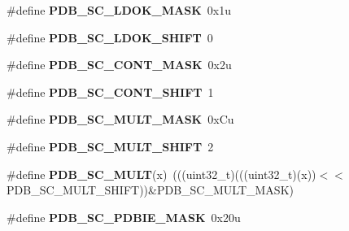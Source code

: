 \begin{DoxyCompactItemize}
\item 
\#define {\bfseries P\+D\+B\+\_\+\+S\+C\+\_\+\+L\+D\+O\+K\+\_\+\+M\+A\+SK}~0x1u\hypertarget{group__PDB__Register__Masks_gabe6a0c2a0e00e0d01b3b94ca8cd90728}{}\label{group__PDB__Register__Masks_gabe6a0c2a0e00e0d01b3b94ca8cd90728}

\item 
\#define {\bfseries P\+D\+B\+\_\+\+S\+C\+\_\+\+L\+D\+O\+K\+\_\+\+S\+H\+I\+FT}~0\hypertarget{group__PDB__Register__Masks_ga8766bd357685d2ec463f51e0b08c6080}{}\label{group__PDB__Register__Masks_ga8766bd357685d2ec463f51e0b08c6080}

\item 
\#define {\bfseries P\+D\+B\+\_\+\+S\+C\+\_\+\+C\+O\+N\+T\+\_\+\+M\+A\+SK}~0x2u\hypertarget{group__PDB__Register__Masks_gaa723ee73c65ba7680ef3c9de87b8a635}{}\label{group__PDB__Register__Masks_gaa723ee73c65ba7680ef3c9de87b8a635}

\item 
\#define {\bfseries P\+D\+B\+\_\+\+S\+C\+\_\+\+C\+O\+N\+T\+\_\+\+S\+H\+I\+FT}~1\hypertarget{group__PDB__Register__Masks_ga49a81fd7584f9957362d71ac5f4d12bb}{}\label{group__PDB__Register__Masks_ga49a81fd7584f9957362d71ac5f4d12bb}

\item 
\#define {\bfseries P\+D\+B\+\_\+\+S\+C\+\_\+\+M\+U\+L\+T\+\_\+\+M\+A\+SK}~0x\+Cu\hypertarget{group__PDB__Register__Masks_ga86e3ec0c9f5ec6d0bbc1ebcf20774b38}{}\label{group__PDB__Register__Masks_ga86e3ec0c9f5ec6d0bbc1ebcf20774b38}

\item 
\#define {\bfseries P\+D\+B\+\_\+\+S\+C\+\_\+\+M\+U\+L\+T\+\_\+\+S\+H\+I\+FT}~2\hypertarget{group__PDB__Register__Masks_gaaf1dfea7eddb56850efd85b75d659ef8}{}\label{group__PDB__Register__Masks_gaaf1dfea7eddb56850efd85b75d659ef8}

\item 
\#define {\bfseries P\+D\+B\+\_\+\+S\+C\+\_\+\+M\+U\+LT}(x)~(((uint32\+\_\+t)(((uint32\+\_\+t)(x))$<$$<$P\+D\+B\+\_\+\+S\+C\+\_\+\+M\+U\+L\+T\+\_\+\+S\+H\+I\+FT))\&P\+D\+B\+\_\+\+S\+C\+\_\+\+M\+U\+L\+T\+\_\+\+M\+A\+SK)\hypertarget{group__PDB__Register__Masks_ga52e674d4841cbe8d87374deadb69b45f}{}\label{group__PDB__Register__Masks_ga52e674d4841cbe8d87374deadb69b45f}

\item 
\#define {\bfseries P\+D\+B\+\_\+\+S\+C\+\_\+\+P\+D\+B\+I\+E\+\_\+\+M\+A\+SK}~0x20u\hypertarget{group__PDB__Register__Masks_ga153222e454507310871a217b8ede92fd}{}\label{group__PDB__Register__Masks_ga153222e454507310871a217b8ede92fd}


\end{DoxyCompactItemize}

